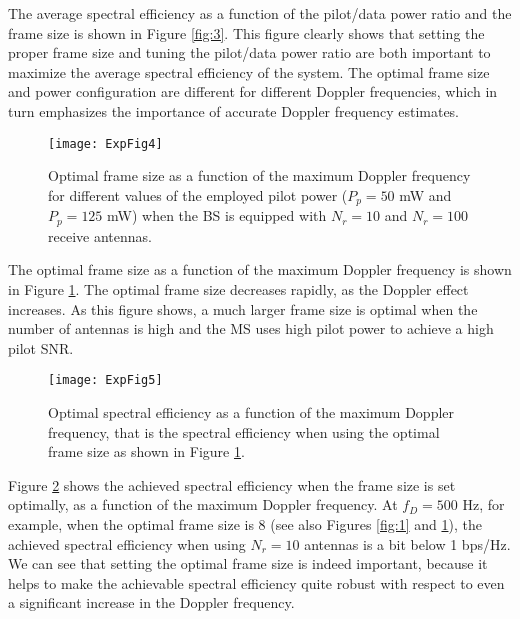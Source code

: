 \documentclass[conference, a4paper, 10pt]{IEEEtran}
\begin{document}
The average spectral efficiency as a function of the pilot/data power ratio and the
frame size is shown in Figure \ref{fig:3}. This figure clearly shows that setting the
proper frame size and tuning the pilot/data power ratio are both important to maximize
the average spectral efficiency of the system. The optimal frame size and power
configuration are different for different Doppler frequencies, which in turn emphasizes
the importance of accurate Doppler frequency estimates.

\begin{figure}[t]
\begin{center}
\texttt{[image: ExpFig4]}
\caption{
Optimal frame size as a function of the maximum Doppler frequency for different values of
the employed pilot power ($P_p=50$ mW and $P_p=125$ mW) when the BS is equipped with $N_r=10$
and $N_r=100$ receive antennas.
}
\label{fig:4}
\end{center}
\end{figure}

The optimal frame size as a function of the maximum Doppler frequency is shown in Figure \ref{fig:4}.
The optimal frame size decreases rapidly, as the Doppler effect increases. As this figure shows,
a much larger frame size is optimal when the number of antennas is high and the \ac{MS} uses high
pilot power to achieve a high pilot \ac{SNR}.

\begin{figure}[t]
\begin{center}
\texttt{[image: ExpFig5]}
\caption{
Optimal spectral efficiency as a function of the maximum Doppler frequency, that is the spectral
efficiency when using the optimal frame size as shown in Figure \ref{fig:4}.
}
\label{fig:5}
\end{center}
\end{figure}

Figure \ref{fig:5} shows the achieved spectral efficiency when the frame size is set optimally,
as a function of the maximum Doppler frequency. At $f_D=500$ Hz, for example, when the optimal
frame size is 8 (see also Figures \ref{fig:1} and \ref{fig:4}), the achieved spectral efficiency
when using $N_r=10$ antennas is a bit below 1 bps/Hz. We can see that setting the optimal frame
size is indeed important, because it helps to make the achievable spectral efficiency quite
robust with respect to even a significant increase in the Doppler frequency.
\end{document}
